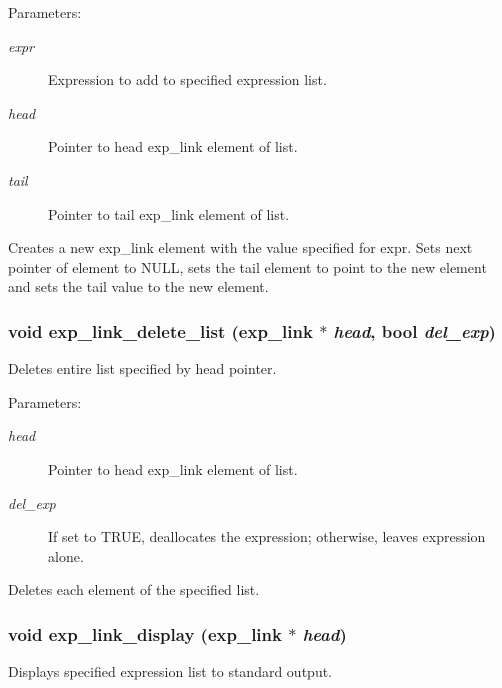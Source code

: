 \begin{Desc}
\item[Parameters: ]\par
\begin{description}
\item[{\em 
expr}]Expression to add to specified expression list. \item[{\em 
head}]Pointer to head exp\_\-link element of list. \item[{\em 
tail}]Pointer to tail exp\_\-link element of list.\end{description}
\end{Desc}
Creates a new exp\_\-link element with the value specified for expr. Sets next pointer of element to NULL, sets the tail element to point to the new element and sets the tail value to the new element. 
\subsubsection{\setlength{\rightskip}{0pt plus 5cm}void exp\_\-link\_\-delete\_\-list ({\bf exp\_\-link} $\ast$ {\em head}, {\bf bool} {\em del\_\-exp})}\label{link_8h_a17}


Deletes entire list specified by head pointer.

\begin{Desc}
\item[Parameters: ]\par
\begin{description}
\item[{\em 
head}]Pointer to head exp\_\-link element of list. \item[{\em 
del\_\-exp}]If set to TRUE, deallocates the expression; otherwise, leaves expression alone.\end{description}
\end{Desc}
Deletes each element of the specified list. 
\subsubsection{\setlength{\rightskip}{0pt plus 5cm}void exp\_\-link\_\-display ({\bf exp\_\-link} $\ast$ {\em head})}\label{link_8h_a7}


Displays specified expression list to standard output.

